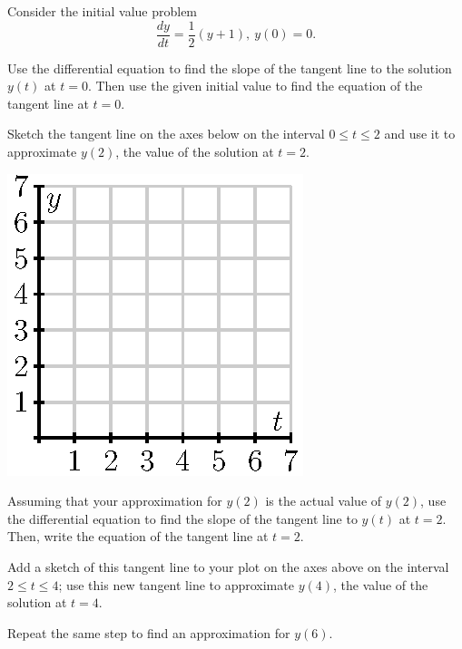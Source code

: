 \begin{pa} \label{PA:7.3}
Consider the initial value problem 
$$
\frac{dy}{dt} = \frac12 (y + 1), \ y(0) = 0.
$$
\ba
\item Use the differential equation to find the slope of the tangent
  line to the solution $y(t)$ at $t=0$.  Then use the given initial value to
  find the equation of the tangent line at $t=0$.  

\item Sketch the tangent line on the axes below on the interval $0\leq
  t\leq 2$ and use it to approximate $y(2)$,
  the value of the solution at $t=2$.   

  \begin{center}
    \includegraphics{figures/7_3_PA.eps}
  \end{center}

\item Assuming that your approximation for $y(2)$ is the actual value
  of $y(2)$, use the differential equation to find the slope of the
  tangent line to $y(t)$ at $t=2$.  Then, write the equation of the
  tangent line at $t=2$.  

\item Add a sketch of this tangent line to your plot on the axes above on the interval $2\leq
  t\leq 4$; use this new tangent line to approximate $y(4)$,
  the value of the solution at $t=4$.   

\item Repeat the same step to find an approximation for $y(6)$.

\ea
\end{pa} 
\afterpa
